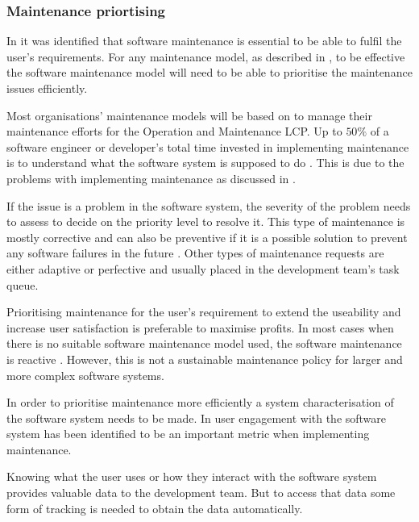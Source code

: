 \subsubsection{Maintenance priortising}\label{sec:ch1_maintenancePriortising}
In  it was identified that software maintenance is essential to be able to fulfil the user's requirements. For any maintenance model, as described in , to be effective the software maintenance model will need to be able to prioritise the maintenance issues efficiently. \par Most organisations' maintenance models will be based on  to manage their maintenance efforts for the Operation and Maintenance LCP. Up to $50\%$ of a software engineer or developer's total time invested in implementing maintenance is to understand what the software system is supposed to do \cite{Tang2010}. This is due to the problems with implementing maintenance as discussed in .\par If the issue is a problem in the software system, the severity of the problem needs to assess to decide on the priority level to resolve it. This type of maintenance is mostly corrective and can also be preventive if it is a possible solution to prevent any software failures in the future \cite{Tang2010}. Other types of maintenance requests are either adaptive or perfective and usually placed in the development team's task queue. \par Prioritising maintenance for the user's requirement to extend the useability and increase user satisfaction is preferable to maximise profits. In most cases when there is no suitable software maintenance model used, the software maintenance is reactive \cite{Araujo2021}. However, this is not a sustainable maintenance policy for larger and more complex software systems. \par In order to prioritise maintenance more efficiently a system characterisation of the software system needs to be made. In  user engagement with the software system has been identified to be an important metric when implementing maintenance.\par Knowing what the user uses or how they interact with the software system provides valuable data to the development team. But to access that data some form of tracking is needed to obtain the data automatically.


\clearpage

